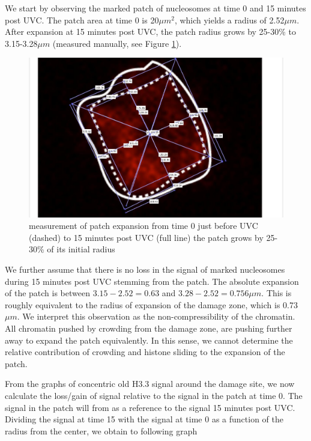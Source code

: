\documentclass[12pt]{report}
\begin{document}
We start by observing the marked patch of nucleosomes at time 0 and 15 minutes post UVC. The patch area at time 0 is 20$\mu m^2$, which yields a radius of 2.52$\mu m$. After expansion at 15 minutes post UVC, the patch radius grows by 25-30\% to 3.15-3.28$\mu m$ (measured manually, see Figure \ref{fig:patchExpansionMeasurement}). 

\begin{figure}[H]
\centering
\includegraphics[width=0.5\linewidth, height=0.3\textheight]{Images/patchExpansion/patchExpansionMeasurement}
\caption{\tiny{measurement of patch expansion from time 0  just before UVC (dashed) to 15 minutes post UVC (full line) the patch grows by 25-30\% of its initial radius}}
\label{fig:patchExpansionMeasurement}
\end{figure}

We further assume that there is no loss in the signal of marked nucleosomes during 15 minutes post UVC stemming from the patch. The absolute expansion of the patch is between $3.15-2.52=0.63$ and $3.28-2.52=0.756\mu m$. This is roughly equivalent to the radius of expansion of the damage zone, which is 0.73 $\mu m$. We interpret this observation as the non-compressibility of the chromatin. All chromatin pushed by crowding from the damage zone, are pushing further away to expand the patch equivalently. In this sense, we cannot determine the relative contribution of crowding and histone sliding to the expansion of the patch. 

From the graphs of concentric old H3.3 signal around the damage site, we now calculate the loss/gain of signal relative to the signal in the patch at time 0. The signal in the patch will from as a reference to the signal 15 minutes post UVC. Dividing the signal at time 15 with the signal at time 0 as a function of the radius from the center, we obtain to following graph
\end{document}
